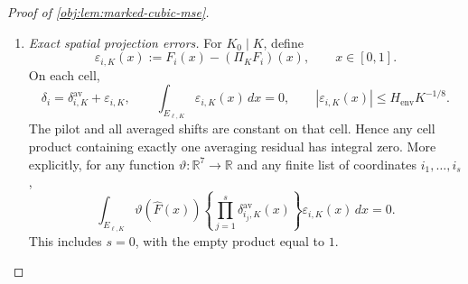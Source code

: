 \documentclass[11pt]{article}
\begin{document}
\begin{proof}[Proof of \cref{obj:lem:marked-cubic-mse}]
\begin{enumerate}
Define the integrated remainder and its majorant by
\[
\mathsf R_{\mathrm{rem},A}
:=\int_0^1\mathcal R_{A,4}(x)\,dx,
\qquad
\mathsf G_{\mathrm{rem}}
:=\frac{M_\Phi}{24}
\int_0^1\left(\sum_i|\delta_i(x)|\right)^4dx.
\]
Then
\[
|\mathsf R_{\mathrm{rem},A}|\le\mathsf G_{\mathrm{rem}},
\qquad
0\le\mathsf G_{\mathrm{rem}}
\le\frac{M_\Phi}{24}(14C_f)^4.
\]
Cauchy--Schwarz on \([0,1]\), followed by the finite-sum eighth-power inequality, gives
\[
\begin{aligned}
\mathbb E_P[\mathsf G_{\mathrm{rem}}^2]
&\le
(M_\Phi/24)^2
\mathbb E_P\int_0^1
\left(\sum_i|\delta_i(x)|\right)^8dx\\
&\le
(M_\Phi/24)^2\,7^7
\sum_{i\in\mathcal I}\mathbb E_P\int_0^1|\delta_i(x)|^8dx\\
&\le
(M_\Phi/24)^2\,7^8C_{\mathrm{pilot},8}n^{-4/5}.
\end{aligned}
\]
Define
\[
\mathcal B_{\mathrm{rem}}
:=(M_\Phi/24)^2\,7^8C_{\mathrm{pilot},8}.
\]
Since \(n^{-4/5}\le n^{-2/3}\),
\[
\mathbb E_P[\mathsf G_{\mathrm{rem}}^2]
\le\mathcal B_{\mathrm{rem}}n^{-2/3}.
\]
Integrating the defining Taylor identity also yields
\[
T_A=
\int_0^1\Phi_A(\widehat F(x))\,dx
+\sum_{s=1}^3\mathsf T^{\mathrm{Taylor}}_{A,s}
+\mathsf R_{\mathrm{rem},A}.
\]

\item \textit{Exact spatial projection errors.}
For \(K_0\mid K\), define
\[
\varepsilon_{i,K}(x):=F_i(x)-(\Pi_KF_i)(x),
\qquad x\in[0,1].
\]
On each cell,
\[
\delta_i=\delta^{\mathrm{av}}_{i,K}+\varepsilon_{i,K},
\qquad
\int_{E_{\ell,K}}\varepsilon_{i,K}(x)\,dx=0,
\qquad
|\varepsilon_{i,K}(x)|\le H_{\mathrm{env}}K^{-1/8}.
\]
The pilot and all averaged shifts are constant on that cell. Hence any cell product containing exactly one averaging residual has integral zero. More explicitly, for any function \(\vartheta:\mathbb R^7\to\mathbb R\) and any finite list of coordinates \(i_1,\ldots,i_s\),
\[
\int_{E_{\ell,K}}
\vartheta(\widehat F(x))
\left\{\prod_{j=1}^s\delta^{\mathrm{av}}_{i_j,K}(x)\right\}
\varepsilon_{i,K}(x)\,dx=0.
\]
This includes \(s=0\), with the empty product equal to \(1\).


\end{enumerate}
\end{proof}
\end{document}
